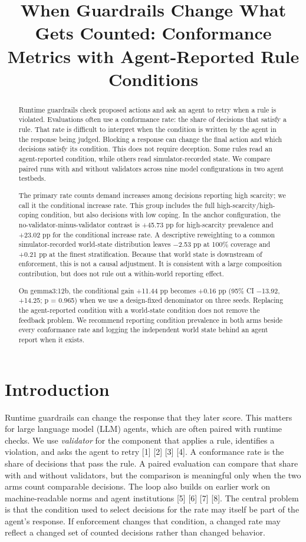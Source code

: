 \documentclass{article}
\title{When Guardrails Change What Gets Counted: Conformance Metrics with Agent-Reported Rule Conditions}
\author{}
\begin{document}
\maketitle

\begin{abstract}
Runtime guardrails check proposed actions and ask an agent to retry when a rule is violated. Evaluations often use a conformance rate: the share of decisions that satisfy a rule. That rate is difficult to interpret when the condition is written by the agent in the response being judged. Blocking a response can change the final action and which decisions satisfy its condition. This does not require deception. Some rules read an agent-reported condition, while others read simulator-recorded state. We compare paired runs with and without validators across nine model configurations in two agent testbeds.

The primary rate counts demand increases among decisions reporting high scarcity; we call it the conditional increase rate. This group includes the full high-scarcity/high-coping condition, but also decisions with low coping. In the anchor configuration, the no-validator-minus-validator contrast is +45.73 pp for high-scarcity prevalence and +23.02 pp for the conditional increase rate. A descriptive reweighting to a common simulator-recorded world-state distribution leaves $-$2.53 pp at 100\% coverage and +0.21 pp at the finest stratification. Because that world state is downstream of enforcement, this is not a causal adjustment. It is consistent with a large composition contribution, but does not rule out a within-world reporting effect.

On gemma3:12b, the conditional gain +11.44 pp becomes +0.16 pp (95\% CI $-$13.92, +14.25; p = 0.965) when we use a design-fixed denominator on three seeds. Replacing the agent-reported condition with a world-state condition does not remove the feedback problem. We recommend reporting condition prevalence in both arms beside every conformance rate and logging the independent world state behind an agent report when it exists.

\end{abstract}
\section{Introduction}
Runtime guardrails can change the response that they later score. This matters for large language model (LLM) agents, which are often paired with runtime checks. We use \textit{validator} for the component that applies a rule, identifies a violation, and asks the agent to retry [1] [2] [3] [4]. A conformance rate is the share of decisions that pass the rule. A paired evaluation can compare that share with and without validators, but the comparison is meaningful only when the two arms count comparable decisions. The loop also builds on earlier work on machine-readable norms and agent institutions [5] [6] [7] [8]. The central problem is that the condition used to select decisions for the rate may itself be part of the agent's response. If enforcement changes that condition, a changed rate may reflect a changed set of counted decisions rather than changed behavior.
\end{document}
